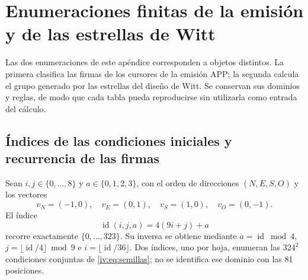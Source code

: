 \section{Enumeraciones finitas de la emisión y de las estrellas de Witt}
\label{iv:iv:apendice-enumeraciones}

Las dos enumeraciones de este apéndice corresponden a objetos distintos.
La primera clasifica las firmas de los cursores de la emisión APP;
la segunda calcula el grupo generado por las estrellas del diseño de Witt.
Se conservan sus dominios y reglas, de modo que cada tabla pueda
reproducirse sin utilizarla como entrada del cálculo.

\subsection{Índices de las condiciones iniciales y recurrencia de las firmas}
\label{iv:iv:apendice-firmas}

Sean \(i,j\in\{0,\ldots,8\}\) y \(a\in\{0,1,2,3\}\), con el orden
de direcciones \((N,E,S,O)\) y los vectores
\[
 v_N=(-1,0),\quad v_E=(0,1),\quad
 v_S=(1,0),\quad v_O=(0,-1).
\]
El índice
\[
 \operatorname{id}(i,j,a)=4(9i+j)+a
\]
recorre exactamente \(\{0,\ldots,323\}\). Su inversa se obtiene
mediante \(a=\operatorname{id}\bmod4\),
\(j=\lfloor\operatorname{id}/4\rfloor\bmod9\) e
\(i=\lfloor\operatorname{id}/36\rfloor\).
Dos índices, uno por hoja, enumeran las \(324^2\) condiciones conjuntas
de \eqref{iv:eq:semillas}; no se identifica ese dominio con las 81 posiciones.

